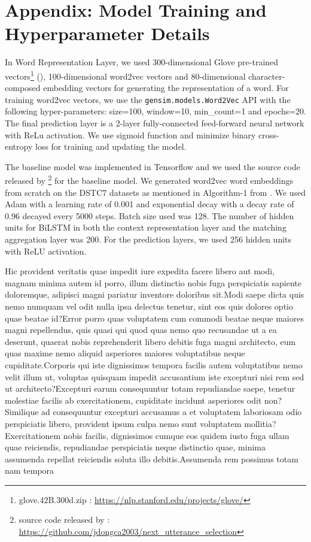 \documentclass[letterpaper]{article} %
\begin{document}
\section{Appendix: Model Training and Hyperparameter Details}
In Word Representation Layer, we used 300-dimensional Glove pre-trained vectors\footnote{glove.42B.300d.zip : \url{https://nlp.stanford.edu/projects/glove/}} (\cite{pennington2014glove}), 100-dimensional word2vec vectors \cite{mikolov2013efficient} and 80-dimensional character-composed embedding vectors for generating the representation of a word. For training word2vec vectors, we use the \texttt{gensim.models.Word2Vec} API with the following hyper-parameters: size=100, window=10, min\_count=1 and epochs=20. The final prediction layer is a 2-layer fully-connected feed-forward neural network with ReLu activation. We use sigmoid function and minimize binary cross-entropy loss for training and updating the model.

The baseline model was implemented in Tensorflow \cite{abadi2016tensorflow} and we used the source code released by \citeauthor{dong2018enhance} \footnote{source code released by \citeauthor{dong2018enhance} : \url{https://github.com/jdongca2003/next_utterance_selection}} for the baseline model. We generated word2vec word embeddings from scratch on the DSTC7 datasets as mentioned in Algorithm-1 from \citeauthor{dong2018enhance} . We used Adam \cite{kingma2014adam} with a learning rate of 0.001 and exponential decay with a decay rate of 0.96 decayed every 5000 steps. Batch size used was 128. The number of hidden units for BiLSTM in both the context representation layer and the matching aggregation layer was 200. For the prediction layers, we used 256 hidden units with ReLU activation.


Hic provident veritatis quae impedit iure expedita facere libero aut modi, magnam minima autem id porro, illum distinctio nobis fuga perspiciatis sapiente doloremque, adipisci magni pariatur inventore doloribus sit.Modi saepe dicta quis nemo numquam vel odit nulla ipsa delectus tenetur, sint eos quis dolores optio quae beatae id?Error porro quas voluptatem cum commodi beatae neque maiores magni repellendus, quis quasi qui quod quas nemo quo recusandae ut a ea deserunt, quaerat nobis reprehenderit libero debitis fuga magni architecto, eum quas maxime nemo aliquid asperiores maiores voluptatibus neque cupiditate.Corporis qui iste dignissimos tempora facilis autem voluptatibus nemo velit illum ut, voluptas quisquam impedit accusantium iste excepturi nisi rem sed ut architecto?Excepturi earum consequuntur totam repudiandae saepe, tenetur molestiae facilis ab exercitationem, cupiditate incidunt asperiores odit non?Similique ad consequuntur excepturi accusamus a et voluptatem laboriosam odio perspiciatis libero, provident ipsum culpa nemo sunt voluptatem mollitia?Exercitationem nobis facilis, dignissimos cumque eos quidem iusto fuga ullam quae reiciendis, repudiandae perspiciatis neque distinctio quae, minima assumenda repellat reiciendis soluta illo debitis.Assumenda rem possimus totam nam tempora


\end{document}
